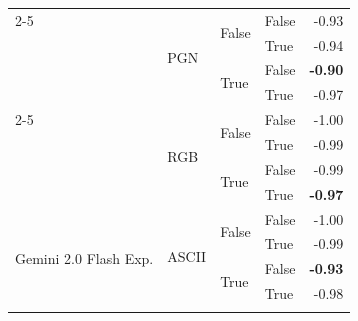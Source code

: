 \begin{tabular}{@{}llllr@{}}
    \cmidrule{2-5}                                                                                                                       
                                                & \multirow[c]{4}{*}{PGN}   & \multirow[c]{2}{*}{False} & False                     & -0.93 \\
                                                &                           &                           & True                      & -0.94 \\
                                                &                           & \multirow[c]{2}{*}{True}  & False                     & \textbf{-0.90} \\
                                                &                           &                           & True                      & -0.97 \\
    \cmidrule{2-5}                                                                                                                       
                                                & \multirow[c]{4}{*}{RGB}   & \multirow[c]{2}{*}{False} & False                     & -1.00 \\
                                                &                           &                           & True                      & -0.99 \\
                                                &                           & \multirow[c]{2}{*}{True}  & False                     & -0.99 \\
                                                &                           &                           & True                      & \textbf{-0.97} \\
    \midrule
    \multirow[c]{17}{*}{Gemini 2.0 Flash Exp.}  & \multirow[c]{4}{*}{ASCII} & \multirow[c]{2}{*}{False} & False                     & -1.00 \\
                                                &                           &                           & True                      & -0.99 \\
                                                &                           & \multirow[c]{2}{*}{True}  & False                     & \textbf{-0.93} \\
                                                &                           &                           & True                      & -0.98 \\
    \cmidrule{2-5}                                                                                                                     

\end{tabular}
